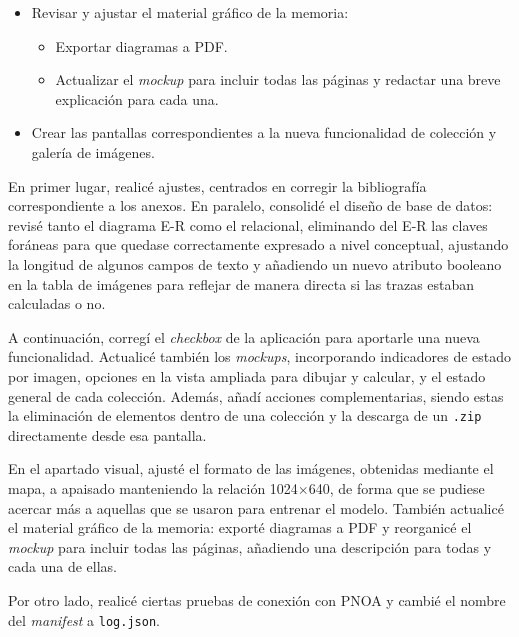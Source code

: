 \begin{itemize}
	\begin{itemize}
		\item Cambiar el nombre del \textit{manifest} a \texttt{log.json}.
		\item Probar de nuevo la descarga y verificar el fallo de conexión por \textit{time limit}.
	\end{itemize}
	\item Revisar y ajustar el material gráfico de la memoria:
	\begin{itemize}
		\item Exportar diagramas a PDF.
		\item Actualizar el \textit{mockup} para incluir todas las páginas y redactar una breve explicación para cada una.
	\end{itemize}
	\item Crear las pantallas correspondientes a la nueva funcionalidad de colección y galería de imágenes.
\end{itemize}

En primer lugar, realicé ajustes, centrados en corregir la bibliografía correspondiente a los anexos. En paralelo, consolidé el diseño de base de datos: revisé tanto el diagrama E-R como el relacional, eliminando del E-R las claves foráneas para que quedase correctamente expresado a nivel conceptual, ajustando la longitud de algunos campos de texto y añadiendo un nuevo atributo booleano en la tabla de imágenes para reflejar de manera directa si las trazas estaban calculadas o no.

A continuación, corregí el \textit{checkbox} de la aplicación para aportarle una nueva funcionalidad. Actualicé también los \textit{mockups}, incorporando indicadores de estado por imagen, opciones en la vista ampliada para dibujar y calcular, y el estado general de cada colección. Además, añadí acciones complementarias, siendo estas la eliminación de elementos dentro de una colección y la descarga de un \texttt{.zip} directamente desde esa pantalla.

En el apartado visual, ajusté el formato de las imágenes, obtenidas mediante el mapa, a apaisado manteniendo la relación 1024$\times$640, de forma que se pudiese acercar más a aquellas que se usaron para entrenar el modelo. También actualicé el material gráfico de la memoria: exporté diagramas a PDF y reorganicé el \textit{mockup} para incluir todas las páginas, añadiendo una descripción para todas y cada una de ellas.

Por otro lado, realicé ciertas pruebas de conexión con PNOA y cambié el nombre del \textit{manifest} a \texttt{log.json}.


